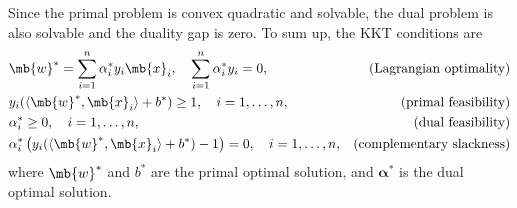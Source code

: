 \begin{exercise}
\begin{enumerate}
\begin{solution}
                Since the primal problem is convex quadratic and solvable, the dual problem is also solvable and the duality gap is zero. To sum up, the KKT conditions are
                \begin{align*}
                     & \mb{w}^* = \sum_{i=1}^n \alpha_i^* y_i \mb{x}_i,\quad \sum_{i=1}^n \alpha_i^* y_i = 0,                 & (\text{Lagrangian optimality})   \\
                     & y_i(\langle \mb{w}^*, \mb{x}_i \rangle + b^*) \ge 1, \quad i = 1, \ldots, n,                           & (\text{primal feasibility})      \\
                     & \alpha_i^* \ge 0, \quad i = 1, \ldots, n,                                                              & (\text{dual feasibility})        \\
                     & \alpha_i^* \left(y_i(\langle \mb{w}^*, \mb{x}_i \rangle + b^*) - 1\right) = 0, \quad i = 1, \ldots, n, & (\text{complementary slackness})
                \end{align*}
                where $\mb{w}^*$ and $b^*$ are the primal optimal solution, and $\bm{\alpha}^*$ is the dual optimal solution.
            \end{solution}

    \end{enumerate}

\end{exercise}
\clearpage




